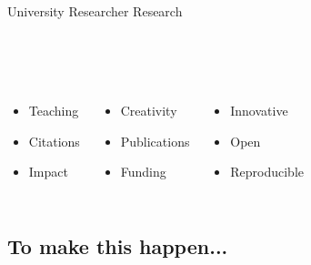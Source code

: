 \documentclass[usenames,dvipsnames]{beamer}
\theoremstyle{plain}
\theoremstyle{definition}
\begin{document}
\begin{frame}{\setframetitle{}}
  \vspace{-0.2cm}
  \begin{columns}[t]
    \centering
    University
    \centering
    Researcher
    \centering
     Research
  \end{columns}


  \vspace{0.2cm} \\
  \begin{columns}[t]
    \centering
    \begin{itemize}
    \item Teaching
    \item Citations
      \item Impact
    \end{itemize}

    \centering
    \begin{itemize}
    \item Creativity
    \item Publications
    \item Funding
    \end{itemize}

    \centering
    \begin{itemize}
    \item Innovative
    \item Open
    \item Reproducible

    \end{itemize}
  \end{columns}
\end{frame}



\subsection{To make this happen...}
\end{document}
